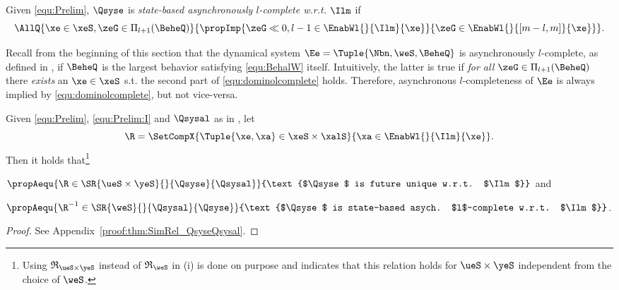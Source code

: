 \begin{definition}\label{def:SBalc}
Given \eqref{equ:Prelim}, $\Qsyse$ is \emph{state-based asynchronously $l$-complete w.r.t. $\Ilm$} if
 \begin{equation}\label{equ:dominolcomplete}
  \AllQ{\xe\in\xeS,\zeG\in\Pi_{l+1}(\BeheQ)}{\propImp{\zeG\ll{0,l-1}\in\EnabWl{}{\Ilm}{\xe}}{\zeG\in\EnabWl{}{[m-l,m]}{\xe}}}.
 \end{equation}
\end{definition}

\begin{remark}\label{rem:SBalc}
Recall from the beginning of this section that the dynamical system $\Ee=\Tuple{\Nbn,\weS,\BeheQ}$ is asynchronously $l$-complete, as  defined in \cite[Def.6]{SchmuckRaisch2014_ControlLetters}, if $\BeheQ$ is the largest behavior satisfying \eqref{equ:BehalW} itself. Intuitively, the latter is true if \emph{for all} $\zeG\in\Pi_{l+1}(\BeheQ)$ there \emph{exists} an $\xe\in\xeS$ s.t. the second part of \eqref{equ:dominolcomplete} holds. Therefore, asynchronous $l$-completeness of $\Ee$ is always implied by \eqref{equ:dominolcomplete}, but not vice-versa. 
\end{remark}

\begin{theorem}\label{thm:SimRel_QsyseQsysal}
Given \eqref{equ:Prelim}, \eqref{equ:Prelim:I} and $\Qsysal$ as in , let
\begin{equation}
\R=\SetCompX{\Tuple{\xe,\xa}\in\xeS\times\xalS}{
\xa\in\EnabWl{}{\Ilm}{\xe}
}\label{equ:R0}.\end{equation}
Then it holds that\footnote{Using $\mathfrak{R}_{\ueS\times\yeS}$ instead of $\mathfrak{R}_{\weS}$ in (i) is done on purpose and indicates that this relation holds for $\ueS\times\yeS$ independent from the choice of $\weS$.} 
\begin{compactenum}[(i)]
 \item $\propAequ{\R\in\SR{\ueS\times\yeS}{}{\Qsyse}{\Qsysal}}{\text{$\Qsyse$ is future unique w.r.t. $\Ilm$}}$ and
 \item $\propAequ{{\R^{-1}\in\SR{\weS}{}{\Qsysal}{\Qsyse}}}{\text{$\Qsyse$ is state-based asych. $l$-complete w.r.t. $\Ilm$}}$.
\end{compactenum}
\end{theorem}

\begin{proof}
See Appendix~\ref{proof:thm:SimRel_QsyseQsysal}. \end{proof}

